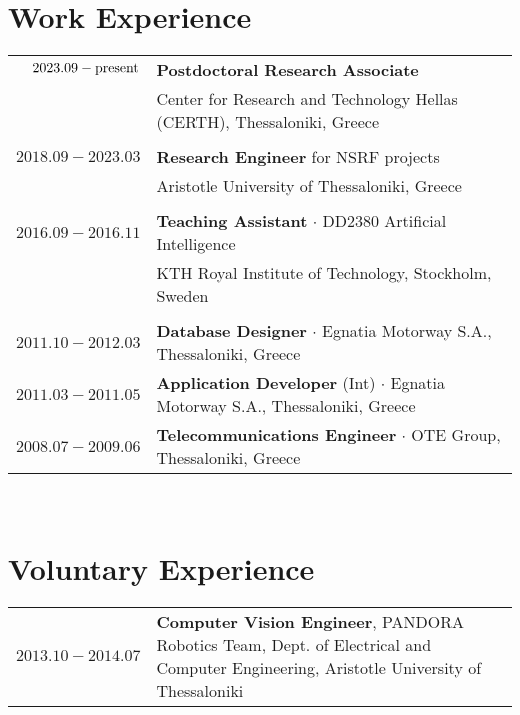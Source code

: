 \documentclass[a4paper,10pt,twoside]{article}
\begin{document}
\section{Work Experience}

\begin{tabular}{rp{12cm}}
$2023.09 - \hfill \textnormal{present} \hfill$ & \textbf{Postdoctoral Research Associate} \\
                    & Center for Research and Technology Hellas (CERTH), Thessaloniki, Greece\\
&\\
$2018.09 - 2023.03$ & \textbf{Research Engineer} for NSRF projects\\
                    & Aristotle University of Thessaloniki, Greece\\
&\\
$2016.09 - 2016.11$ & \textbf{Teaching Assistant} $\cdot$ DD2380 Artificial Intelligence\\
                    & KTH Royal Institute of Technology, Stockholm, Sweden\\
&\\
$2011.10 - 2012.03$ & \textbf{Database Designer} $\cdot$ Egnatia Motorway S.A., Thessaloniki, Greece\\
$2011.03 - 2011.05$ & \textbf{Application Developer} (Int) $\cdot$ Egnatia Motorway S.A., Thessaloniki, Greece\\
$2008.07 - 2009.06$ & \textbf{Telecommunications Engineer} $\cdot$ OTE Group, Thessaloniki, Greece\\
\end{tabular} \\


\section{Voluntary Experience}

\begin{tabular}{rp{12cm}}
$2013.10 - 2014.07$ & \textbf{Computer Vision Engineer}, PANDORA Robotics Team,
Dept. of Electrical and Computer Engineering, Aristotle University of Thessaloniki \\
\end{tabular} \\
\end{document}
